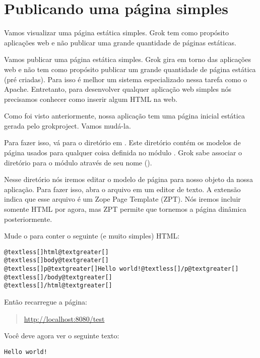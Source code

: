 \documentclass[a4paper,12pt,portuguese]{manual}
\begin{document}
\section{Publicando uma página simples}

Vamos visualizar uma página estática simples. Grok tem como propósito
aplicações web e não publicar uma grande quantidade de páginas
estáticas.

Vamos publicar uma página estática simples. Grok gira em torno das
aplicações web e não tem como propósito publicar um grande quantidade
de página estática (pré criadas). Para isso é melhor um sistema
especializado nessa tarefa como o Apache. Entretanto, para desenvolver
qualquer aplicação web simples nós precisamos conhecer como inserir
algum HTML na web.

Como foi visto anteriormente, nossa aplicação  tem uma
página inicial estática gerada pelo grokproject. Vamos
mudá-la.

Para fazer isso, vá para o diretório  em
.
Este diretório contém os modelos de página usados para qualquer coisa
definida no módulo . Grok sabe associar o diretório para o
módulo através de seu nome ().

Nesse diretório nós iremos editar o modelo de página  para
nosso objeto  da nossa aplicação. Para fazer isso, abra o
arquivo  em um editor de texto. A extensão  indica
que esse arquivo é um Zope Page Template (ZPT). Nós iremos incluir somente
HTML por agora, mas ZPT permite que tornemos a página dinâmica
posteriormente.

Mude o  para conter o seguinte (e muito simples) HTML:

\begin{Verbatim}[commandchars=@\[\]]
@textless[]html@textgreater[]
@textless[]body@textgreater[]
@textless[]p@textgreater[]Hello world!@textless[]/p@textgreater[]
@textless[]/body@textgreater[]
@textless[]/html@textgreater[]
\end{Verbatim}

Então recarregue a página:
\begin{quote}

\href{http://localhost:8080/test}{http://localhost:8080/test}
\end{quote}

Você deve agora ver o seguinte texto:

\begin{Verbatim}[commandchars=@\[\]]
Hello world!
\end{Verbatim}
\end{document}
